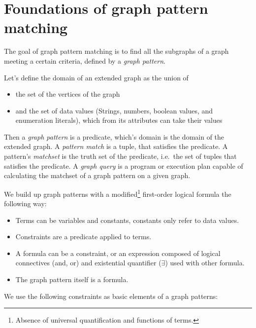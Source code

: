 \section{Foundations of graph pattern matching}
\label{section:gpmc}


The goal of graph pattern matching is to find all the subgraphs of a graph meeting a certain criteria, defined by a \emph{graph pattern}.

Let's define the domain of an extended graph as the union of 
\begin{itemize}
	\item the set of the vertices of the graph
	\item and the set of data values (Strings, numbers, boolean values, and enumeration literals), which from its attributes can take their values
\end{itemize}

Then a \emph{graph pattern} is a predicate, which's domain is the domain of the extended graph.
A \emph{pattern match} is a tuple, that satisfies the predicate.
A pattern's \emph{matchset} is the truth set of the predicate, i.e.\ the set of tuples that satisfies the predicate.
A \emph{graph query} is a program or execution plan capable of calculating the matchset of a graph pattern on a given graph. 



We build up graph patterns with a modified\footnote{ Absence of universal quantification and functions of terms.  } first-order logical formula the following way:
\begin{itemize}
	\item Terms can be variables and constants, constants only refer to data values.
	\item Constraints are a predicate applied to terms. 
	\item A formula can be a constraint, or an expression composed of logical connectives (and, or) and existential quantifier ($\exists{}$) used with other formula.
	\item The graph pattern itself is a formula.
\end{itemize}

We use the following constraints as basic elements of a graph patterns:

